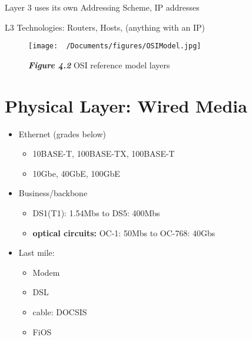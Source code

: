 \documentclass{report}
\begin{document}
\noindent Layer 3 uses its own Addressing Scheme, IP addresses \vspace{2mm}

\noindent L3 Technologies: Routers, Hosts, (anything with an IP)

\begin{figure}[ht]
\centering
\texttt{[image:  ~/Documents/figures/OSIModel.jpg]}
\caption*{ \textit{\textbf{Figure 4.2}} OSI reference model layers}
\end{figure}
\section{Physical Layer: Wired Media}
\begin{itemize}
  \item Ethernet (grades below)
    \begin{itemize}[label=$\circ$]
      \item 10BASE-T, 100BASE-TX, 100BASE-T
      \item 10Gbe, 40GbE, 100GbE
    \end{itemize}
  \item Business/backbone
    \begin{itemize}[label=$\circ$]
      \item DS1(T1): 1.54Mbs to DS5: 400Mbs
      \item \textbf{optical circuits:} OC-1: 50Mbs to OC-768: 40Gbs
    \end{itemize}
  \item Last mile:
    \begin{itemize}[label=$\circ$]
      \item Modem
      \item DSL
      \item cable: DOCSIS
      \item FiOS
    \end{itemize}
\end{itemize}
\end{document}
